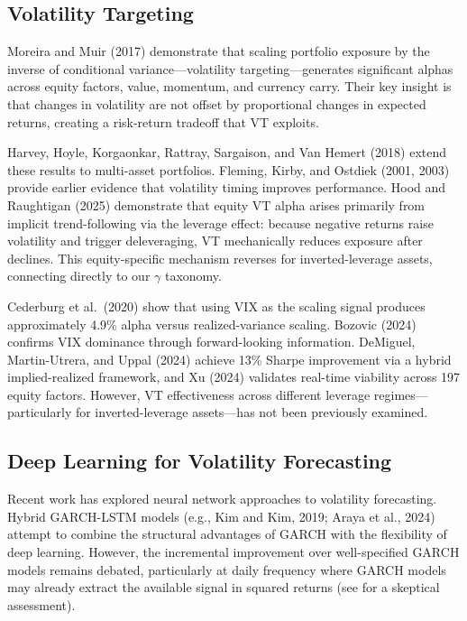 \subsection{Volatility Targeting}

Moreira and Muir (2017) demonstrate that scaling portfolio exposure by the inverse of conditional variance---volatility targeting---generates significant alphas across equity factors, value, momentum, and currency carry. Their key insight is that changes in volatility are not offset by proportional changes in expected returns, creating a risk-return tradeoff that VT exploits.

Harvey, Hoyle, Korgaonkar, Rattray, Sargaison, and Van Hemert (2018) extend these results to multi-asset portfolios. Fleming, Kirby, and Ostdiek (2001, 2003) provide earlier evidence that volatility timing improves performance. Hood and Raughtigan (2025) demonstrate that equity VT alpha arises primarily from implicit trend-following via the leverage effect: because negative returns raise volatility and trigger deleveraging, VT mechanically reduces exposure after declines. This equity-specific mechanism reverses for inverted-leverage assets, connecting directly to our $\gamma$ taxonomy.

Cederburg et al.\ (2020) show that using VIX as the scaling signal produces approximately 4.9\% alpha versus realized-variance scaling. Bozovic (2024) confirms VIX dominance through forward-looking information. DeMiguel, Martin-Utrera, and Uppal (2024) achieve 13\% Sharpe improvement via a hybrid implied-realized framework, and Xu (2024) validates real-time viability across 197 equity factors. However, VT effectiveness across different leverage regimes---particularly for inverted-leverage assets---has not been previously examined.

\subsection{Deep Learning for Volatility Forecasting}

Recent work has explored neural network approaches to volatility forecasting. Hybrid GARCH-LSTM models (e.g., Kim and Kim, 2019; Araya et al., 2024) attempt to combine the structural advantages of GARCH with the flexibility of deep learning. However, the incremental improvement over well-specified GARCH models remains debated, particularly at daily frequency where GARCH models may already extract the available signal in squared returns (see \citealt{bucci2020} for a skeptical assessment).



